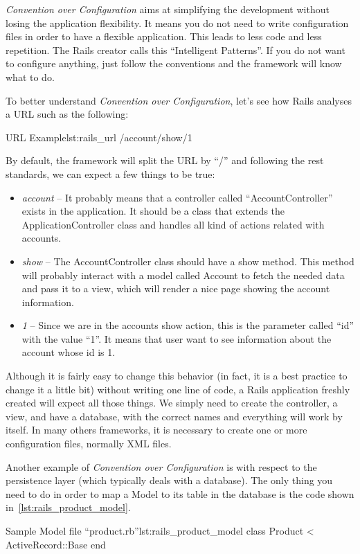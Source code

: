\emph{Convention over Configuration} aims at simplifying the development without losing the application flexibility. 
It means you do not need to write configuration files in order to have a flexible application. 
This leads to less code and less repetition.
The Rails creator calls this “Intelligent Patterns”. 
If you do not want to configure anything, just follow the conventions and the framework will know what to do.

To better understand \emph{Convention over Configuration}, 
let's see how Rails analyses a URL such as the following:

\begin{rubycode}{URL Example}{lst:rails_url}
  /account/show/1

\end{rubycode}
By default, the framework will split the URL by “/” and following the rest standards, 
we can expect a few things to be true: 

\begin{itemize}
\item \emph{account} – It probably means that a controller called “AccountController” exists in the application. It should be a class that extends the ApplicationController class and handles all kind of actions related with accounts.
\item \emph{show} – The AccountController class should have a show method.
This method will probably interact with a model called Account to fetch the needed data and pass it to a view, 
which will render a nice page showing the account information.
\item \emph{1} – Since we are in the accounts show action, this is the parameter called “id” with the value “1”. 
It means that user want to see information about the account whose id is 1. 
\end{itemize}

Although it is fairly easy to change this behavior (in fact, it is a best practice to change it a little bit) 
without writing one line of code, a Rails application freshly created will expect all those things.
We simply need to create the controller, a view, and have a database, with the correct names and everything will work by itself. 
In many others frameworks, it is necessary to create one or more configuration files, normally XML files.

Another example of \emph{Convention over Configuration} is with respect to the persistence layer 
(which typically deals with a database). 
The only thing you need to do in order to map a Model to its table in the database is 
the code shown in~\ref{lst:rails_product_model}.
\begin{rubycode}{Sample Model file “product.rb”}{lst:rails_product_model}
class Product < ActiveRecord::Base 
end
\end{rubycode}


